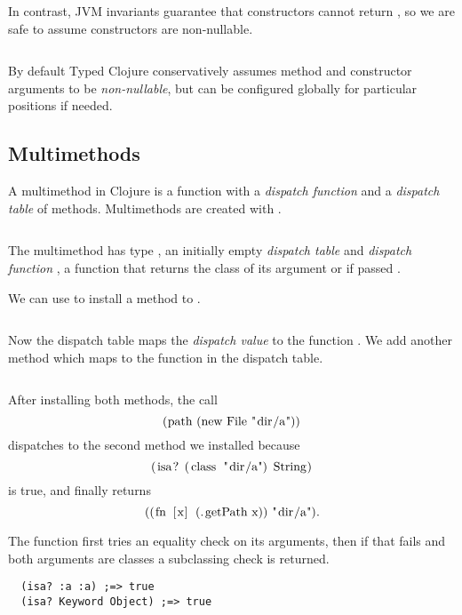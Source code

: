 \begin{exmp}
\inputminted[firstline=6,lastline=8]{clojure}{code/demo/src/demo/parent3.clj}
\end{exmp}

In contrast, JVM invariants guarantee that  constructors cannot return ,
so we are safe to assume constructors are non-nullable.

\begin{exmp}
\inputminted[firstline=15,lastline=16]{clojure}{code/demo/src/demo/parent3.clj}
\end{exmp}

By default Typed Clojure conservatively assumes method and constructor arguments to be \emph{non-nullable},
but can be configured globally for particular positions if needed.

\subsection{Multimethods}

\label{sec:multioverview}

A multimethod in Clojure is a function with a \emph{dispatch
function} and a \emph{dispatch table} of methods. Multimethods are created with {}.
\inputminted[firstline=5,lastline=6]{clojure}{code/demo/src/demo/rep.clj}
The multimethod  has type , an initially empty \emph{dispatch table}
and \emph{dispatch function} , a function that
returns the class of its argument or  if passed .

We can use {} to install a method to .
\inputminted[firstline=7,lastline=7]{clojure}{code/demo/src/demo/rep.clj}
Now the dispatch table maps
the \emph{dispatch value}  to the function
. 
We add another method
which maps
 to the function
in the dispatch table.
\inputminted[firstline=8,lastline=8]{clojure}{code/demo/src/demo/rep.clj}

After installing both methods, the call 
$$
\clj{(path (new File "dir/a"))}
$$
dispatches to the second method we installed because
$$
\clj{(isa? (class "dir/a") String)}
$$
is true, and finally returns 
$$
\clj{((fn [x] (.getPath x)) "dir/a")}.
$$

The  function first tries an equality check
on its arguments, then if that fails
and both arguments are classes a subclassing
check is returned.
\begin{verbatim}
  (isa? :a :a) ;=> true
  (isa? Keyword Object) ;=> true
\end{verbatim}

